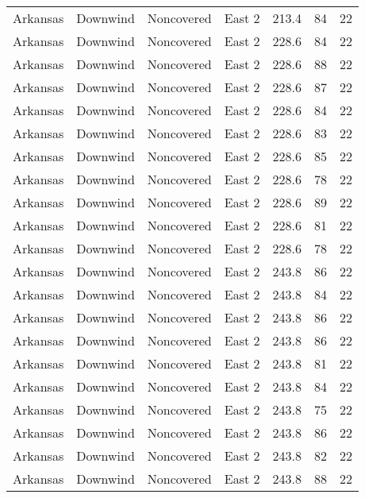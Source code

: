 \documentclass{article}
\begin{document}
\begin{longtable}[H]{ccccccc}
Arkansas & Downwind  & Noncovered & East 2        & 213.4        & 84          & 22  \\
Arkansas & Downwind  & Noncovered & East 2        & 228.6        & 84          & 22  \\
Arkansas & Downwind  & Noncovered & East 2        & 228.6        & 88          & 22  \\
Arkansas & Downwind  & Noncovered & East 2        & 228.6        & 87          & 22  \\
Arkansas & Downwind  & Noncovered & East 2        & 228.6        & 84          & 22  \\
Arkansas & Downwind  & Noncovered & East 2        & 228.6        & 83          & 22  \\
Arkansas & Downwind  & Noncovered & East 2        & 228.6        & 85          & 22  \\
Arkansas & Downwind  & Noncovered & East 2        & 228.6        & 78          & 22  \\
Arkansas & Downwind  & Noncovered & East 2        & 228.6        & 89          & 22  \\
Arkansas & Downwind  & Noncovered & East 2        & 228.6        & 81          & 22  \\
Arkansas & Downwind  & Noncovered & East 2        & 228.6        & 78          & 22  \\
Arkansas & Downwind  & Noncovered & East 2        & 243.8        & 86          & 22  \\
Arkansas & Downwind  & Noncovered & East 2        & 243.8        & 84          & 22  \\
Arkansas & Downwind  & Noncovered & East 2        & 243.8        & 86          & 22  \\
Arkansas & Downwind  & Noncovered & East 2        & 243.8        & 86          & 22  \\
Arkansas & Downwind  & Noncovered & East 2        & 243.8        & 81          & 22  \\
Arkansas & Downwind  & Noncovered & East 2        & 243.8        & 84          & 22  \\
Arkansas & Downwind  & Noncovered & East 2        & 243.8        & 75          & 22  \\
Arkansas & Downwind  & Noncovered & East 2        & 243.8        & 86          & 22  \\
Arkansas & Downwind  & Noncovered & East 2        & 243.8        & 82          & 22  \\
Arkansas & Downwind  & Noncovered & East 2        & 243.8        & 88          & 22  \\

\end{longtable}
\end{document}

